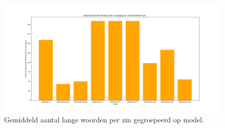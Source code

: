 \begin{figure}
	\includegraphics[width=\linewidth]{img/boxplot-tobe-a2.png}
	\caption{Gemiddeld aantal lange woorden per zin gegroepeerd op model.}
	\label{img:histplot-tobe-a2}
\end{figure}
